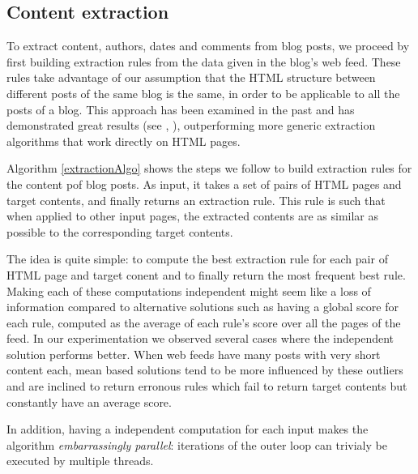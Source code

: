 \subsection{Content extraction}
To extract content, authors, dates and comments from blog posts, we proceed by first building extraction rules from the data given in the blog's web feed. These rules take advantage of our assumption that the HTML structure between different posts of the same blog is the same, in order to be applicable to all the posts of a blog. This approach has been examined in the past and has demonstrated great results (see \cite{gkotsis2013}, \cite{oita2010}), outperforming more generic extraction algorithms that work directly on HTML pages.

\extractionAlgo

Algorithm \ref{extractionAlgo} shows the steps we follow to build extraction rules for the content pof blog posts. As input, it takes a set of pairs of HTML pages and target contents, and finally returns an extraction rule. This rule is such that when applied to other input pages, the extracted contents are as similar as possible to the corresponding target contents. %

The idea is quite simple: to compute the best extraction rule for each pair of HTML page and target conent and to finally return the most frequent best rule. Making each of these computations independent might seem like a loss of information compared to alternative solutions such as having a global score for each rule, computed as the average of each rule's score over all the pages of the feed. In our experimentation we observed several cases where the independent solution performs better. When web feeds have many posts with very short content each, mean based solutions tend to be more influenced by these outliers and are inclined to return erronous rules which fail to return target contents but constantly have an average score.

In addition, having a independent computation for each input makes the algorithm \emph{embarrassingly parallel}: iterations of the outer loop can trivialy be executed by multiple threads.

